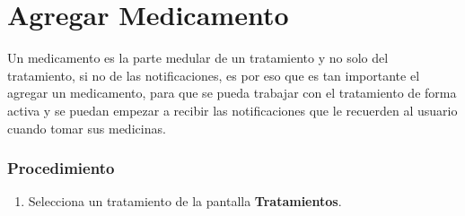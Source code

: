 \section{Agregar Medicamento}

Un medicamento es la parte medular de un tratamiento y no solo del tratamiento, si no de las notificaciones, es por eso que es tan importante el agregar un medicamento, para que se pueda trabajar con el tratamiento de forma activa y se puedan empezar a recibir las notificaciones que le recuerden al usuario cuando tomar sus medicinas.

\subsubsection{Procedimiento}
\begin{enumerate}
	
	\item Selecciona un tratamiento de la pantalla \textbf{Tratamientos}.


\end{enumerate}
